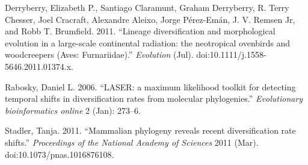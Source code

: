 \documentclass[author-year, review, 12pt]{elsarticle} %
\begin{document}
Derryberry, Elizabeth P., Santiago Claramunt, Graham Derryberry, R.
Terry Chesser, Joel Cracraft, Alexandre Aleixo, Jorge Pérez-Emán, J. V.
Remsen Jr, and Robb T. Brumfield. 2011. ``Lineage diversification and
morphological evolution in a large-scale continental radiation: the
neotropical ovenbirds and woodcreepers (Aves: Furnariidae).''
\emph{Evolution} (Jul). doi:10.1111/j.1558-5646.2011.01374.x.

Rabosky, Daniel L. 2006. ``LASER: a maximum likelihood toolkit for
detecting temporal shifts in diversification rates from molecular
phylogenies.'' \emph{Evolutionary bioinformatics online} 2 (Jan):
273--6.

Stadler, Tanja. 2011. ``Mammalian phylogeny reveals recent
diversification rate shifts.'' \emph{Proceedings of the National Academy
of Sciences} 2011 (Mar). doi:10.1073/pnas.1016876108.

%
\end{document}
